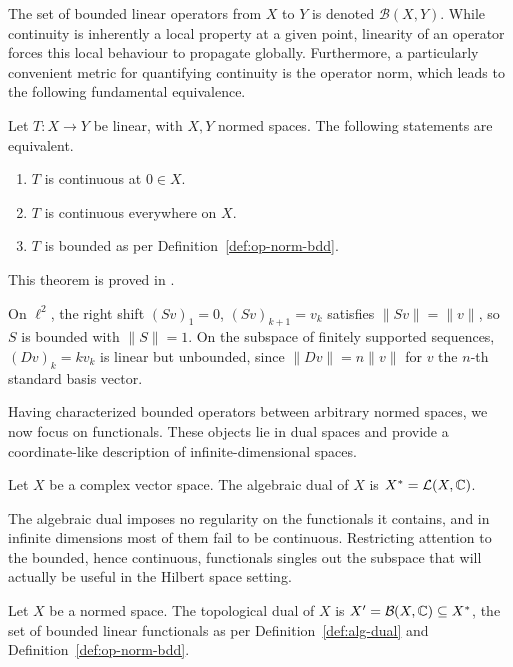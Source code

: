 \noindent The set of bounded linear operators from $X$ to $Y$ is denoted $\mathcal{B}(X,Y)$. While continuity is inherently a local property at a given point, linearity of an operator forces this local behaviour to propagate globally. Furthermore, a particularly convenient metric for quantifying continuity is the operator norm, which leads to the following fundamental equivalence.

\begin{theorem}\label{thm:cont-iff-bdd}
	Let $T: X\to Y$ be linear, with $X,Y$ normed spaces. The following statements are equivalent.
	\begin{enumerate}
		\item $T$ is continuous at $0\in X$.
		\item $T$ is continuous everywhere on $X$.
		\item $T$ is bounded as per Definition~\ref{def:op-norm-bdd}.
	\end{enumerate}
\end{theorem}

\noindent This theorem is proved in \cite[Theorem 3.11]{morettiSpectralTheoryQuantum}.

\begin{example}\label{ex:shift-diagonal}
	On $\ell^2$, the right shift $(Sv)_1=0$, $(Sv)_{k+1}=v_k$ satisfies $\|Sv\|=\|v\|$, so $S$ is bounded with $\|S\|=1$. On the subspace of finitely supported sequences, $(Dv)_k=kv_k$ is linear but unbounded, since $\|Dv\|=n\|v\|$ for $v$ the $n$-th standard basis vector.
\end{example}

\noindent Having characterized bounded operators between arbitrary normed spaces, we now focus on functionals. These objects lie in dual spaces and provide a coordinate-like description of infinite-dimensional spaces. 

\begin{definition}\label{def:alg-dual}
	Let $X$ be a complex vector space. The algebraic dual of $X$ is $X^{*}=\mathcal{L}(X,\C)$.
\end{definition}

The algebraic dual imposes no regularity on the functionals it contains, and in infinite dimensions most of them fail to be continuous. Restricting attention to the bounded, hence continuous, functionals singles out the subspace that will actually be useful in the Hilbert space setting.

\begin{definition}\label{def:top-dual}
	Let $X$ be a normed space. The topological dual of $X$ is $X'=\mathcal{B}(X,\C)\subseteq X^{*}$, the set of bounded linear functionals as per Definition~\ref{def:alg-dual} and Definition~\ref{def:op-norm-bdd}. 
\end{definition}

